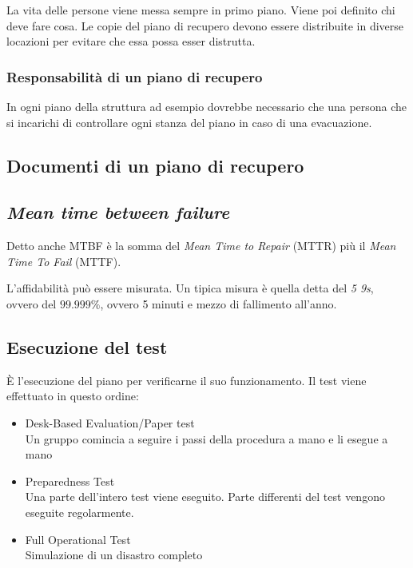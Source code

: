 La vita delle persone viene messa sempre in primo piano. Viene poi definito chi 
deve fare cosa. Le copie del piano di recupero devono essere distribuite in 
diverse locazioni per evitare che essa possa esser distrutta.

\subsubsection{Responsabilità di un piano di recupero}

In ogni piano della struttura ad esempio dovrebbe necessario che una persona 
che si incarichi di controllare ogni stanza del piano in caso di una 
evacuazione.

\subsection{Documenti di un piano di recupero}


\subsection{\textit{Mean time between failure}}

Detto anche MTBF è la somma del \textit{Mean Time to Repair} (MTTR) più il 
\textit{Mean Time To Fail} (MTTF).


L'affidabilità può essere misurata. Un tipica misura è quella detta del 
\textit{5 9s}, ovvero del $99.999\%$, ovvero 5 minuti e mezzo di fallimento 
all'anno.

\subsection{Esecuzione del test}

È l'esecuzione del piano per verificarne il suo funzionamento.
Il test viene effettuato in questo ordine:
\begin{itemize}
  \item Desk-Based Evaluation/Paper test \\
  Un gruppo comincia a seguire i passi della procedura a mano e li esegue a mano
  \item Preparedness Test \\
  Una parte dell'intero test viene eseguito. Parte differenti del test vengono 
  eseguite regolarmente.
  \item Full Operational Test \\
  Simulazione di un disastro completo
\end{itemize}

